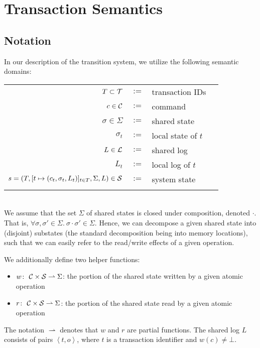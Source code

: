 \section{Transaction Semantics}

\subsection{Notation}

In our description of the transition system, we utilize the following semantic domains:
\\
\begin{tabular}{rcll}
	\\
	$T \subset {\cal T}$ & $:=$ & transaction IDs \\
	$c \in {\cal C}$ & $:=$ & command \\
	$\sigma \in \Sigma$ & $:=$ & shared state \\
	${\sigma_t}$ & $:=$ & local state of $t$ \\
	$L \in {\cal L}$ & $:=$ & shared log \\
	$L_t$ & $:=$ & local log of $t$ \\
	$s = (T, [t \mapsto (c_t,\sigma_t,L_t)]_{t \in T}, \Sigma, L) \in {\cal S}$ & $:=$ & system state \\
	\\
\end{tabular}
\\
We assume that the set $\Sigma$ of shared states is closed under composition, denoted $\cdot$. That is,
$\forall \sigma,\sigma' \in \Sigma.\ \sigma \cdot \sigma' \in \Sigma$. Hence, we can decompose a given shared state into (disjoint) substates (the standard decomposition being into memory locations), such that we can easily refer to the read/write effects of a given operation.

We additionally define two helper functions:
\begin{itemize}
\item $w \colon\ {\cal C} \times {\cal S} \rightharpoonup \Sigma$: the portion of the shared state written by a given atomic operation
\item $r \colon\ {\cal C} \times {\cal S} \rightharpoonup \Sigma$: the portion of the shared state read by a given atomic operation
\end{itemize}
The notation $\rightharpoonup$ denotes that $w$ and $r$ are partial functions. The shared log $L$ consists of pairs $\left\langle t,o \right\rangle$, where $t$ is a transaction identifier and $w(c) \neq \bot$.

